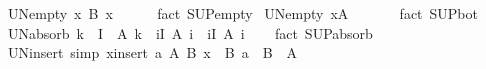 \begin{isabellebody}
\isanewline
{}\isamarkupfalse%
\ UN{\isacharunderscore}{\kern0pt}empty{\isacharcolon}{\kern0pt}\ {\isachardoublequoteopen}{\isacharparenleft}{\kern0pt}{\isasymUnion}x{\isasymin}{\isacharbraceleft}{\kern0pt}{\isacharbraceright}{\kern0pt}{\isachardot}{\kern0pt}\ B\ x{\isacharparenright}{\kern0pt}\ {\isacharequal}{\kern0pt}\ {\isacharbraceleft}{\kern0pt}{\isacharbraceright}{\kern0pt}{\isachardoublequoteclose}\isanewline
%
\isadelimproof
\ \ %
\endisadelimproof
%
\isatagproof
{}\isamarkupfalse%
\ {\isacharparenleft}{\kern0pt}fact\ SUP{\isacharunderscore}{\kern0pt}empty{\isacharparenright}{\kern0pt}%
\endisatagproof
{\isafoldproof}%
%
\isadelimproof
\isanewline
%
\endisadelimproof
\isanewline
{}\isamarkupfalse%
\ UN{\isacharunderscore}{\kern0pt}empty{}{\isacharcolon}{\kern0pt}\ {\isachardoublequoteopen}{\isacharparenleft}{\kern0pt}{\isasymUnion}x{\isasymin}A{\isachardot}{\kern0pt}\ {\isacharbraceleft}{\kern0pt}{\isacharbraceright}{\kern0pt}{\isacharparenright}{\kern0pt}\ {\isacharequal}{\kern0pt}\ {\isacharbraceleft}{\kern0pt}{\isacharbraceright}{\kern0pt}{\isachardoublequoteclose}\isanewline
%
\isadelimproof
\ \ %
\endisadelimproof
%
\isatagproof
{}\isamarkupfalse%
\ {\isacharparenleft}{\kern0pt}fact\ SUP{\isacharunderscore}{\kern0pt}bot{\isacharparenright}{\kern0pt}%
\endisatagproof
{\isafoldproof}%
%
\isadelimproof
%
\endisadelimproof
\ \isanewline
\isanewline
{}\isamarkupfalse%
\ UN{\isacharunderscore}{\kern0pt}absorb{\isacharcolon}{\kern0pt}\ {\isachardoublequoteopen}k\ {\isasymin}\ I\ {\isasymLongrightarrow}\ A\ k\ {\isasymunion}\ {\isacharparenleft}{\kern0pt}{\isasymUnion}i{\isasymin}I{\isachardot}{\kern0pt}\ A\ i{\isacharparenright}{\kern0pt}\ {\isacharequal}{\kern0pt}\ {\isacharparenleft}{\kern0pt}{\isasymUnion}i{\isasymin}I{\isachardot}{\kern0pt}\ A\ i{\isacharparenright}{\kern0pt}{\isachardoublequoteclose}\isanewline
%
\isadelimproof
\ \ %
\endisadelimproof
%
\isatagproof
{}\isamarkupfalse%
\ {\isacharparenleft}{\kern0pt}fact\ SUP{\isacharunderscore}{\kern0pt}absorb{\isacharparenright}{\kern0pt}%
\endisatagproof
{\isafoldproof}%
%
\isadelimproof
\isanewline
%
\endisadelimproof
\isanewline
{}\isamarkupfalse%
\ UN{\isacharunderscore}{\kern0pt}insert\ {\isacharbrackleft}{\kern0pt}simp{\isacharbrackright}{\kern0pt}{\isacharcolon}{\kern0pt}\ {\isachardoublequoteopen}{\isacharparenleft}{\kern0pt}{\isasymUnion}x{\isasymin}insert\ a\ A{\isachardot}{\kern0pt}\ B\ x{\isacharparenright}{\kern0pt}\ {\isacharequal}{\kern0pt}\ B\ a\ {\isasymunion}\ {\isasymUnion}{\isacharparenleft}{\kern0pt}B\ {\isacharbackquote}{\kern0pt}\ A{\isacharparenright}{\kern0pt}{\isachardoublequoteclose}\isanewline

\end{isabellebody}
